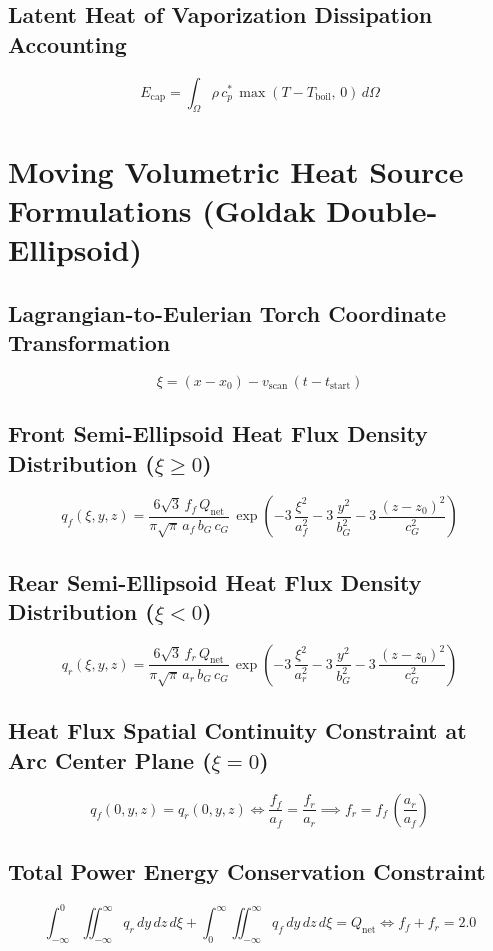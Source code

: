 \documentclass[10pt,a4paper]{article}
\begin{document}
\subsection*{Latent Heat of Vaporization Dissipation Accounting}
\[
E_{\mathrm{cap}} = \int_{\Omega} \rho\,c_p^*\,\max(T - T_{\mathrm{boil}},\,0)\,d\Omega
\]

\clearpage
\section{Moving Volumetric Heat Source Formulations (Goldak Double-Ellipsoid)}

\subsection*{Lagrangian-to-Eulerian Torch Coordinate Transformation}
\[
\xi = (x - x_0) - v_{\mathrm{scan}}\,(t - t_{\mathrm{start}})
\]

\subsection*{Front Semi-Ellipsoid Heat Flux Density Distribution ($\xi \ge 0$)}
\[
q_f(\xi, y, z) = \frac{6\sqrt{3}\,f_f\,Q_{\mathrm{net}}}{\pi\sqrt{\pi}\,a_f\,b_G\,c_G}\,\exp\left( -3\,\frac{\xi^2}{a_f^2} - 3\,\frac{y^2}{b_G^2} - 3\,\frac{(z - z_0)^2}{c_G^2} \right)
\]

\subsection*{Rear Semi-Ellipsoid Heat Flux Density Distribution ($\xi < 0$)}
\[
q_r(\xi, y, z) = \frac{6\sqrt{3}\,f_r\,Q_{\mathrm{net}}}{\pi\sqrt{\pi}\,a_r\,b_G\,c_G}\,\exp\left( -3\,\frac{\xi^2}{a_r^2} - 3\,\frac{y^2}{b_G^2} - 3\,\frac{(z - z_0)^2}{c_G^2} \right)
\]

\subsection*{Heat Flux Spatial Continuity Constraint at Arc Center Plane ($\xi = 0$)}
\[
q_f(0, y, z) = q_r(0, y, z) \iff \frac{f_f}{a_f} = \frac{f_r}{a_r} \implies f_r = f_f\,\left(\frac{a_r}{a_f}\right)
\]

\subsection*{Total Power Energy Conservation Constraint}
\[
\int_{-\infty}^{0} \iint_{-\infty}^{\infty} q_r\,dy\,dz\,d\xi + \int_{0}^{\infty} \iint_{-\infty}^{\infty} q_f\,dy\,dz\,d\xi = Q_{\mathrm{net}} \iff f_f + f_r = 2.0
\]
\end{document}

